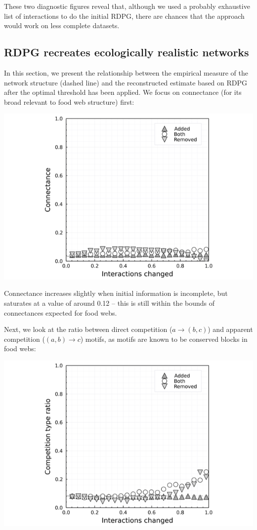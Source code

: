 These two diagnostic figures reveal that, although we used a probably
exhaustive list of interactions to do the initial RDPG, there are
chances that the approach would work on less complete datasets.

\subsection{RDPG recreates ecologically realistic
networks}\label{rdpg-recreates-ecologically-realistic-networks}

In this section, we present the relationship between the empirical
measure of the network structure (dashed line) and the reconstructed
estimate based on RDPG after the optimal threshold has been applied. We
focus on connectance (for its broad relevant to food web structure)
first:

\includegraphics[width=\textwidth]{./figures/supplementary/sensibility_connectance.png}

Connectance increases slightly when initial information is incomplete,
but saturates at a value of around 0.12 -- this is still within the
bounds of connectances expected for food webs.

Next, we look at the ratio between direct competition
(\(a \rightarrow (b,c)\)) and apparent competition
(\((a,b) \rightarrow c\)) motifs, as motifs are known to be conserved
blocks in food webs:

\includegraphics[width=\textwidth]{./figures/supplementary/sensibility_motifs.png}

